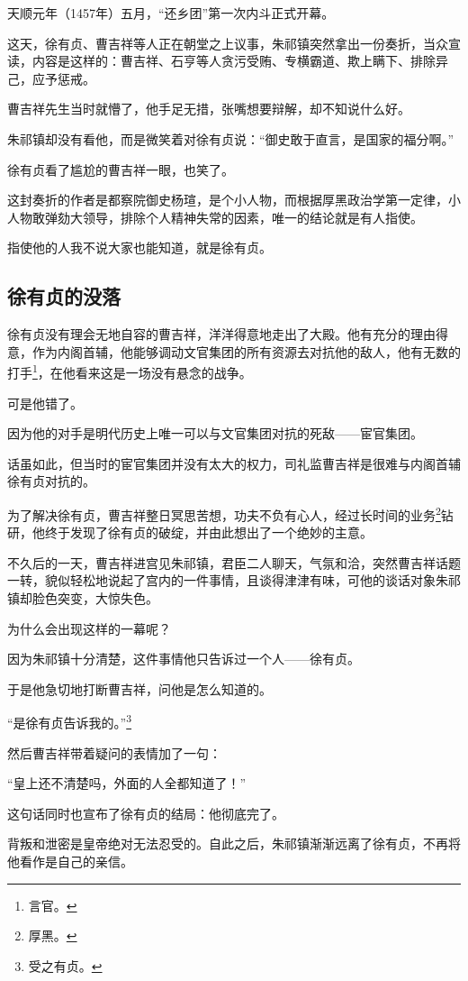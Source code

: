 \begin{multicols}{\theparacolNo}
天顺元年（1457年）五月，“还乡团”第一次内斗正式开幕。

这天，徐有贞、曹吉祥等人正在朝堂之上议事，朱祁镇突然拿出一份奏折，当众宣读，内容是这样的：曹吉祥、石亨等人贪污受贿、专横霸道、欺上瞒下、排除异己，应予惩戒。

曹吉祥先生当时就懵了，他手足无措，张嘴想要辩解，却不知说什么好。

朱祁镇却没有看他，而是微笑着对徐有贞说：“御史敢于直言，是国家的福分啊。”

徐有贞看了尴尬的曹吉祥一眼，也笑了。

这封奏折的作者是都察院御史杨瑄，是个小人物，而根据厚黑政治学第一定律，小人物敢弹劾大领导，排除个人精神失常的因素，唯一的结论就是有人指使。

指使他的人我不说大家也能知道，就是徐有贞。

\subsection{徐有贞的没落}
徐有贞没有理会无地自容的曹吉祥，洋洋得意地走出了大殿。他有充分的理由得意，作为内阁首辅，他能够调动文官集团的所有资源去对抗他的敌人，他有无数的打手\footnote{言官。}，在他看来这是一场没有悬念的战争。

可是他错了。

因为他的对手是明代历史上唯一可以与文官集团对抗的死敌——宦官集团。

话虽如此，但当时的宦官集团并没有太大的权力，司礼监曹吉祥是很难与内阁首辅徐有贞对抗的。

为了解决徐有贞，曹吉祥整日冥思苦想，功夫不负有心人，经过长时间的业务\footnote{厚黑。}钻研，他终于发现了徐有贞的破绽，并由此想出了一个绝妙的主意。

不久后的一天，曹吉祥进宫见朱祁镇，君臣二人聊天，气氛和洽，突然曹吉祥话题一转，貌似轻松地说起了宫内的一件事情，且谈得津津有味，可他的谈话对象朱祁镇却脸色突变，大惊失色。

为什么会出现这样的一幕呢？

因为朱祁镇十分清楚，这件事情他只告诉过一个人——徐有贞。

于是他急切地打断曹吉祥，问他是怎么知道的。

“是徐有贞告诉我的。”\footnote{受之有贞。}

然后曹吉祥带着疑问的表情加了一句：

“皇上还不清楚吗，外面的人全都知道了！”

这句话同时也宣布了徐有贞的结局：他彻底完了。

背叛和泄密是皇帝绝对无法忍受的。自此之后，朱祁镇渐渐远离了徐有贞，不再将他看作是自己的亲信。


\end{multicols}
